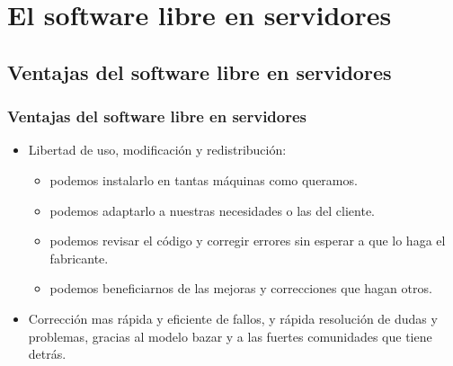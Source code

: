 \documentclass{beamer}
\begin{document}


\normalsize




\section{El software libre en servidores}

\subsection{Ventajas del software libre en servidores}
\begin{frame}
\frametitle{Ventajas del software libre en servidores}

\begin{itemize}
\item Libertad de uso, modificación y redistribución: 
	\begin{itemize}
	\item podemos \alert{instalarlo} en tantas máquinas como queramos.
	\item podemos \alert{adaptarlo} a nuestras necesidades o las del cliente.
	\item podemos revisar el código y \alert{corregir} errores sin esperar a que lo haga el fabricante.
	\item podemos beneficiarnos de las mejoras y correcciones que hagan otros.
	\end{itemize}

\item  Corrección mas rápida y eficiente de fallos, y rápida resolución de dudas y problemas, gracias al \alert{modelo bazar} y a las fuertes comunidades que tiene detrás.

\end{itemize}
\end{frame}

\end{document}
